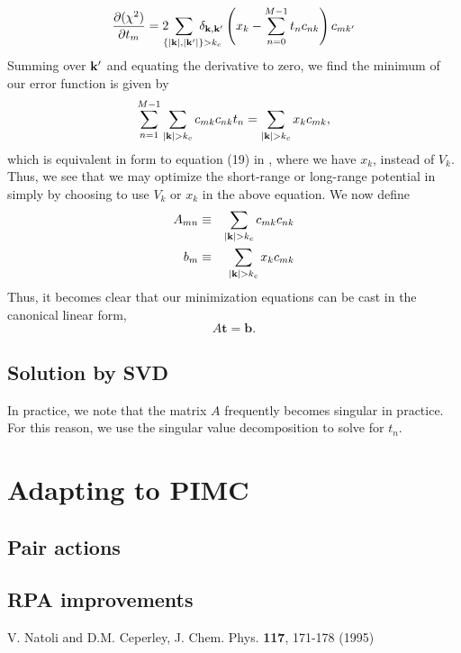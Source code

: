 \documentclass{article}
\begin{document}
\begin{equation}
\frac{\partial (\chi^2)}{\partial t_{m}} =
2 \ns\ns\ns\ns\ns\ns\ns 
\sum_{\ \ \ \ \{|\vk|,|\vk'|\}>k_c} \ns\ns\ns\ns\ns\ns\ns \delta_{\vk, \vk'} 
\left(x_k -\sum_{n=0}^{M-1} t_n c_{nk} \right) c_{mk'}
\end{equation}
Summing over $\mathbf{k}'$ and equating the derivative to zero, we find the
minimum of our error function is given by
\begin{equation}
\sum_{n=1}^{M-1} \sum_{|\vk|>k_c} c_{mk}c_{nk} t_n = 
\sum_{|\vk|>k_c} x_k c_{mk},
\end{equation}
which is equivalent in form to equation (19) in \cite{Natoli}, where
we have $x_k$, instead of $V_k$.  Thus, we see that we may optimize
the short-range or long-range potential in simply by choosing to use
$V_k$ or $x_k$ in the above equation.  We now define
\begin{eqnarray}
A_{mn} & \equiv & \sum_{|\vk|>k_c} c_{mk} c_{nk} \\
b_{m} & \equiv & \sum_{|\vk|>k_c} x_k c_{mk}
\end{eqnarray}
Thus, it becomes clear that our minimization equations can be cast in
the canonical linear form,
\begin{equation}
A\mathbf{t} = \mathbf{b}.
\end{equation}
\subsection{Solution by SVD}
In practice, we note that the matrix $A$ frequently becomes singular
in practice.  For this reason, we use the singular value decomposition
to solve for $t_n$.  


\section{Adapting to PIMC}
\subsection{Pair actions}
\subsection{RPA improvements}

\begin{thebibliography}{9}
   V. Natoli and D.M. Ceperley, J. Chem. Phys. {\bf
  117}, 171-178 (1995)
\end{thebibliography}
\end{document}
